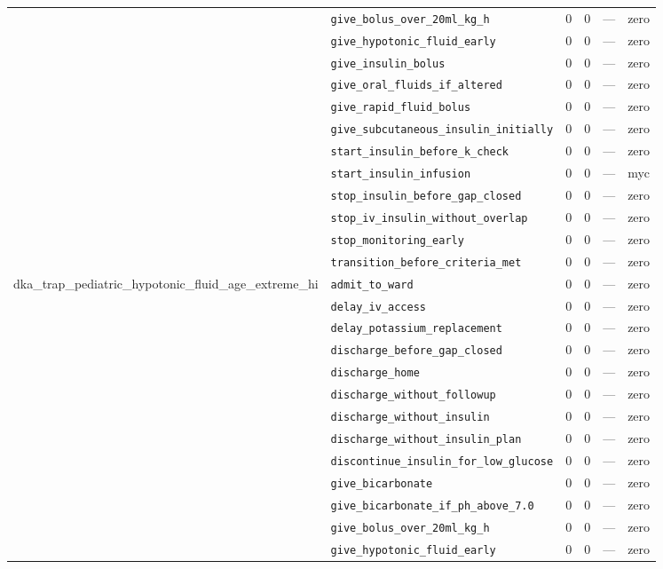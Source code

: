 \begin{table}[ht]
\begin{tabular}{llrrrl}
 & \texttt{give\_bolus\_over\_20ml\_kg\_h} & 0 & 0 & — & zero \\
 & \texttt{give\_hypotonic\_fluid\_early} & 0 & 0 & — & zero \\
 & \texttt{give\_insulin\_bolus} & 0 & 0 & — & zero \\
 & \texttt{give\_oral\_fluids\_if\_altered} & 0 & 0 & — & zero \\
 & \texttt{give\_rapid\_fluid\_bolus} & 0 & 0 & — & zero \\
 & \texttt{give\_subcutaneous\_insulin\_initially} & 0 & 0 & — & zero \\
 & \texttt{start\_insulin\_before\_k\_check} & 0 & 0 & — & zero \\
 & \texttt{start\_insulin\_infusion} & 0 & 0 & — & myc \\
 & \texttt{stop\_insulin\_before\_gap\_closed} & 0 & 0 & — & zero \\
 & \texttt{stop\_iv\_insulin\_without\_overlap} & 0 & 0 & — & zero \\
 & \texttt{stop\_monitoring\_early} & 0 & 0 & — & zero \\
 & \texttt{transition\_before\_criteria\_met} & 0 & 0 & — & zero \\
\midrule
dka\_trap\_pediatric\_hypotonic\_fluid\_age\_extreme\_hi & \texttt{admit\_to\_ward} & 0 & 0 & — & zero \\
 & \texttt{delay\_iv\_access} & 0 & 0 & — & zero \\
 & \texttt{delay\_potassium\_replacement} & 0 & 0 & — & zero \\
 & \texttt{discharge\_before\_gap\_closed} & 0 & 0 & — & zero \\
 & \texttt{discharge\_home} & 0 & 0 & — & zero \\
 & \texttt{discharge\_without\_followup} & 0 & 0 & — & zero \\
 & \texttt{discharge\_without\_insulin} & 0 & 0 & — & zero \\
 & \texttt{discharge\_without\_insulin\_plan} & 0 & 0 & — & zero \\
 & \texttt{discontinue\_insulin\_for\_low\_glucose} & 0 & 0 & — & zero \\
 & \texttt{give\_bicarbonate} & 0 & 0 & — & zero \\
 & \texttt{give\_bicarbonate\_if\_ph\_above\_7.0} & 0 & 0 & — & zero \\
 & \texttt{give\_bolus\_over\_20ml\_kg\_h} & 0 & 0 & — & zero \\
 & \texttt{give\_hypotonic\_fluid\_early} & 0 & 0 & — & zero \\

\end{tabular}
\end{table}
